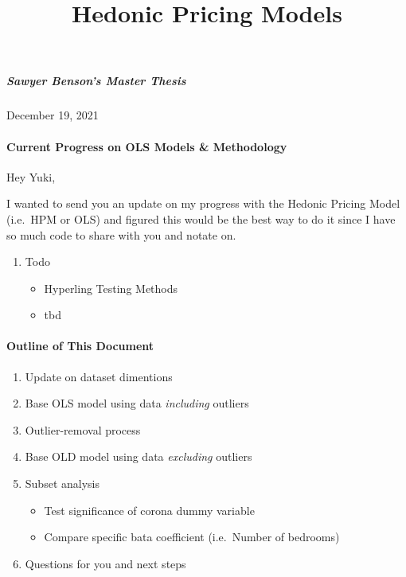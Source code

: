 \documentclass[
]{article}
\title{Hedonic Pricing Models}
\author{}
\date{\vspace{-2.5em}}
\providecommand{\tightlist}{%
  \setlength{\itemsep}{0pt}\setlength{\parskip}{0pt}}
\begin{document}
\maketitle

\hypertarget{sawyer-bensons-master-thesis}{%
\subparagraph{Sawyer Benson's Master
Thesis}\label{sawyer-bensons-master-thesis}}

December 19, 2021

\hypertarget{current-progress-on-ols-models-methodology}{%
\paragraph{Current Progress on OLS Models \&
Methodology}\label{current-progress-on-ols-models-methodology}}

Hey Yuki,

I wanted to send you an update on my progress with the Hedonic Pricing
Model (i.e.~HPM or OLS) and figured this would be the best way to do it
since I have so much code to share with you and notate on.

\begin{enumerate}
\def\labelenumi{\arabic{enumi}.}
\tightlist
\item
  Todo

  \begin{itemize}
  \tightlist
  \item
    Hyperling Testing Methods
  \item
    tbd
  \end{itemize}
\end{enumerate}

\hypertarget{outline-of-this-document}{%
\paragraph{Outline of This Document}\label{outline-of-this-document}}

\begin{enumerate}
\def\labelenumi{\arabic{enumi}.}
\tightlist
\item
  Update on dataset dimentions
\item
  Base OLS model using data \emph{including} outliers
\item
  Outlier-removal process
\item
  Base OLD model using data \emph{excluding} outliers
\item
  Subset analysis

  \begin{itemize}
  \tightlist
  \item
    Test significance of corona dummy variable
  \item
    Compare specific bata coefficient (i.e.~Number of bedrooms)
  \end{itemize}
\item
  Questions for you and next steps
\end{enumerate}
\end{document}
